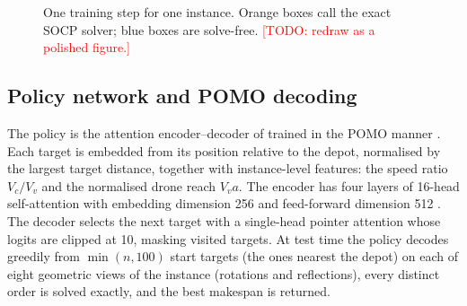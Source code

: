 \documentclass[preprint,review,12pt,authoryear]{elsarticle}
\newcommand{\todo}[1]{\textcolor{red}{[TODO: #1]}}
\begin{document}
\begin{figure}[t]\centering
{}
\caption{One training step for one instance. Orange boxes call the exact SOCP solver; blue boxes are
solve-free. \todo{redraw as a polished figure.}}\label{fig:framework}
\end{figure}

\subsection{Policy network and POMO decoding}
The policy is the attention encoder--decoder of \citet{kool2019attention} trained in the POMO manner
\citep{kwon2020pomo}. Each target is embedded from its position relative to the depot, normalised by the
largest target distance, together with instance-level features: the speed ratio $V_c/V_v$ and the normalised
drone reach $V_v a$. The encoder has four layers of 16-head self-attention with embedding dimension 256 and
feed-forward dimension 512 \citep{vaswani2017attention}. The decoder selects the next target with a
single-head pointer attention whose logits are clipped at 10, masking visited targets. At test time the
policy decodes greedily from $\min(n,100)$ start targets (the ones nearest the depot) on each of eight geometric
views of the instance (rotations and reflections), every distinct order is solved exactly, and the best
makespan is returned.
\end{document}
